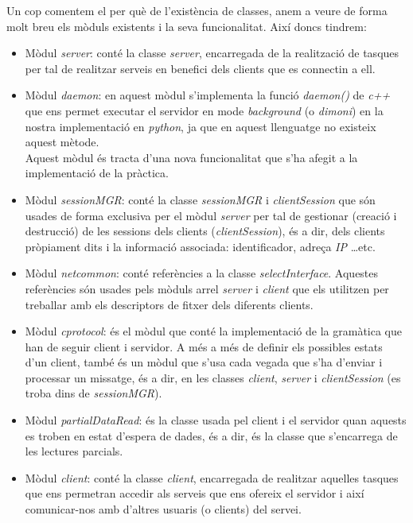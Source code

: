 \documentclass[a4paper,10pt]{article}
\begin{document}
	Un cop comentem el per què de l'existència de classes, anem a veure de forma molt breu els mòduls existents i la seva funcionalitat. Així doncs tindrem:
		\begin{itemize}
		\item Mòdul \emph{server}: conté la classe \emph{server}, encarregada de la realització de tasques per tal de realitzar serveis en benefici dels clients que es connectin a ell.
		\item Mòdul \emph{daemon}: en aquest mòdul s'implementa la funció \emph{daemon()} de \emph{c++} que ens permet executar el servidor en mode \emph{background} (o \emph{dimoni}) en la nostra implementació en \emph{python}, ja que en aquest llenguatge no existeix aquest mètode.\\
		Aquest mòdul és tracta d'una nova funcionalitat que s'ha afegit a la implementació de la pràctica.
		\item Mòdul \emph{sessionMGR}: conté la classe \emph{sessionMGR} i \emph{clientSession} que són usades de forma exclusiva per el mòdul \emph{server} per tal de gestionar (creació i destrucció) de les sessions dels clients (\emph{clientSession}), és a dir, dels clients pròpiament dits i la informació associada: identificador, adreça \emph{IP} \ldots etc.
		\item Mòdul \emph{netcommon}: conté referències a la classe \emph{selectInterface}. Aquestes referències són usades pels mòduls arrel \emph{server} i \emph{client} que els utilitzen per treballar amb els descriptors de fitxer dels diferents clients.
		\item Mòdul \emph{cprotocol}: és el mòdul que conté la implementació de la gramàtica que han de seguir client i servidor. A més a més de definir els possibles estats d'un client, també és un mòdul que s'usa cada vegada que s'ha d'enviar i processar un missatge, és a dir, en les classes \emph{client}, \emph{server} i \emph{clientSession} (es troba dins de \emph{sessionMGR}).
		\item Mòdul \emph{partialDataRead}: és la classe usada pel client i el servidor quan aquests es troben en estat d'espera de dades, és a dir, és la classe que s'encarrega de les lectures parcials.
		\item Mòdul \emph{client}: conté la classe \emph{client}, encarregada de realitzar aquelles tasques que ens permetran accedir als serveis que ens ofereix el servidor i així comunicar-nos amb d'altres usuaris (o clients) del servei.
		\end{itemize}
\end{document}
